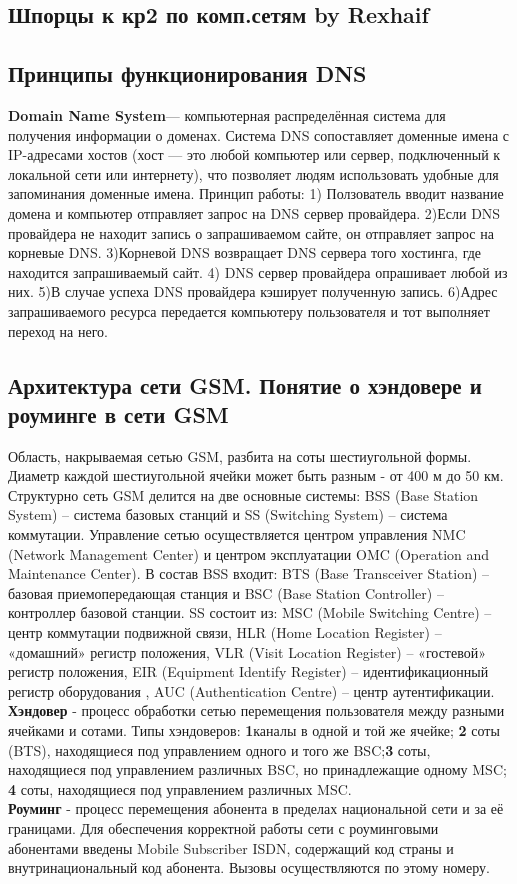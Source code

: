 \documentclass[unicode, 12pt, a4paper,oneside]{article}
\begin{document}
\begin{multicols}{2}
\section{Шпорцы к кр2 по комп.сетям by Rexhaif}
\subsection{Принципы функционирования DNS}
{\bf Domain Name System}— компьютерная распределённая система для получения информации о доменах. Система DNS сопоставляет доменные имена с IP-адресами хостов (хост — это любой компьютер или сервер, подключенный к локальной сети или интернету), что позволяет людям использовать удобные для запоминания доменные имена.
Принцип работы: 1) Ползователь вводит название домена и компьютер отправляет запрос на DNS сервер провайдера. 2)Если DNS провайдера не находит запись о запрашиваемом сайте, он отправляет запрос на корневые DNS. 3)Корневой DNS возвращает DNS сервера того хостинга, где находится запрашиваемый сайт. 4) DNS сервер провайдера опрашивает любой из них. 5)В случае успеха DNS провайдера кэширует полученную запись. 6)Адрес запрашиваемого ресурса передается компьютеру пользователя и тот выполняет переход на него.

\subsection{Архитектура сети GSM. Понятие о хэндовере и роуминге в сети GSM}
Область, накрываемая сетью GSM, разбита на соты шестиугольной формы. Диаметр каждой шестиугольной ячейки может быть разным - от 400 м до 50 км. Структурно сеть GSM делится на две основные системы: BSS (Base Station System) – система базовых станций и SS (Switching System) – система коммутации. Управление сетью осуществляется центром управления NMC (Network Management Center) и центром эксплуатации OMC (Operation and Maintenance Center). В состав BSS входит: BTS (Base Transceiver Station) – базовая приемопередающая станция и BSC (Base Station Controller) – контроллер базовой станции. SS состоит из: MSC (Mobile Switching Centre) – центр коммутации подвижной связи, HLR (Home Location Register) – «домашний» регистр положения, VLR (Visit Location Register) – «гостевой» регистр положения, EIR (Equipment Identify Register) – идентификационный регистр оборудования , AUC (Authentication Centre) – центр аутентификации.\\
{\bf Хэндовер} - процесс обработки сетью перемещения пользователя между разными ячейками и сотами.  Типы хэндоверов: {\bf 1}каналы в одной и той же ячейке; {\bf 2} соты (BTS), находящиеся под управлением одного и того же BSC;{\bf 3}  соты, находящиеся под управлением различных BSC, но принадлежащие одному MSC; {\bf 4} соты, находящиеся под управлением различных MSC.\\
{\bf Роуминг} - процесс перемещения абонента в пределах национальной сети и за её границами. Для обеспечения корректной работы сети с роуминговыми абонентами введены Mobile Subscriber ISDN, содержащий код страны и внутринациональный код абонента. Вызовы осуществляются по этому номеру.


\end{multicols}
\end{document}

